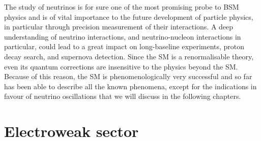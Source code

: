 The study of neutrinos is for sure one of the most promising probe to BSM physics and %
is of vital importance to the future development of particle physics, %
in particular through precision measurement of their interactions.
A deep understanding of neutrino interactions, and neutrino-nucleon interactions in particular, %
could lead to a great impact on long-baseline experiments, proton decay search, and supernova detection.
Since the SM is a renormalisable theory, even its quantum corrections are insensitive to the physics beyond the SM.
Because of this reason, the SM is phenomenologically very successful and so far has been able to describe all the known
phenomena, except for the indications in favour of neutrino oscillations that we will discuss in the following chapters.

\section{Electroweak sector}
\label{sec:ew_sector}

